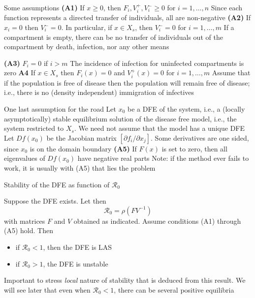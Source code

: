 \documentclass[aspectratio=169]{beamer}\usepackage[]{graphicx}\usepackage[]{xcolor}
\begin{document}
\begin{frame}{Some assumptions}
\bbullet\textbf{(A1)}
If $x\geq 0$, then $F_i,V_i^+,V_i^-\geq 0$ for $i=1,\ldots,n$
\vfill
Since each function represents a directed transfer of individuals, all are non-negative
\vfill
\bbullet\textbf{(A2)} 
If $x_i=0$ then $V_i^-=0$. In particular, if $x\in X_s$, then $V_i^-=0$ for $i=1,\ldots,m$
\vfill
If a compartment is empty, there can be no transfer of individuals out of the compartment by death, infection, nor any other means
\end{frame}

\begin{frame}
\bbullet \textbf{(A3)} $F_i=0$ if $i>m$
\vfill
The incidence of infection for uninfected compartments is zero
\vfill
\bbullet \textbf{A4} If $x\in X_s$ then $F_i(x)=0$ and $V_i^+(x)=0$ for $i=1,\ldots,m$
\vfill
Assume that if the population is free of disease then the population will remain free of disease; i.e., there is no (density independent) immigration of infectives
\end{frame}

\begin{frame}{One last assumption for the road}
Let $x_0$ be a DFE of the system, i.e., a (locally asymptotically) stable equilibrium solution of the disease free model, i.e., the system restricted to $X_s$. We need not assume that the model has a unique DFE
\vfill
Let $Df(x_0)$ be the Jacobian matrix $[\partial f_i/\partial x_j]$. Some derivatives are one sided, since $x_0$ is on the domain boundary
\vfill
\textbf{(A5)} If $F(x)$ is set to zero, then all eigenvalues of $Df(x_0)$ have negative real parts
\vfill
Note: if the method ever fails to work, it is usually with (A5) that lies the problem
\end{frame}

\begin{frame}{Stability of the DFE as function of $\mathcal{R}_0$}
\begin{theorem}\label{th:R0_VdDW}
Suppose the DFE exists. Let then
\[
\mathcal{R}_0=\rho(FV^{-1})
\]
with matrices $F$ and $V$ obtained as indicated. Assume conditions (A1) through (A5) hold. Then
\begin{itemize}
\item if $\mathcal{R}_0<1$, then the DFE is LAS
\item if $\mathcal{R}_0>1$, the DFE is unstable
\end{itemize}
\end{theorem}
\vfill
Important to stress \emph{local} nature of stability that is deduced from this result. We will see later that even when $\mathcal{R}_0<1$, there can be several positive equilibria
\end{frame}
\end{document}
